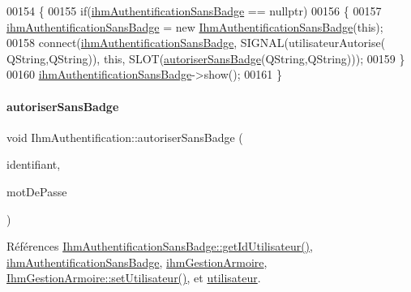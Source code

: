 \begin{DoxyCode}
00154 \{
00155     \textcolor{keywordflow}{if}(\hyperlink{class_ihm_authentification_a9444198403beeaf7386488d56f8ad7f2}{ihmAuthentificationSansBadge} == \textcolor{keyword}{nullptr})
00156     \{
00157         \hyperlink{class_ihm_authentification_a9444198403beeaf7386488d56f8ad7f2}{ihmAuthentificationSansBadge} = \textcolor{keyword}{new} 
      \hyperlink{class_ihm_authentification_sans_badge}{IhmAuthentificationSansBadge}(\textcolor{keyword}{this});
00158         connect(\hyperlink{class_ihm_authentification_a9444198403beeaf7386488d56f8ad7f2}{ihmAuthentificationSansBadge}, SIGNAL(utilisateurAutorise(
      QString,QString)), \textcolor{keyword}{this}, SLOT(\hyperlink{class_ihm_authentification_add8f8e7a0fbf70cef9399ba9f7db7b7e}{autoriserSansBadge}(QString,QString)));
00159     \}    
00160     \hyperlink{class_ihm_authentification_a9444198403beeaf7386488d56f8ad7f2}{ihmAuthentificationSansBadge}->show();
00161 \}
\end{DoxyCode}
\mbox{\label{class_ihm_authentification_add8f8e7a0fbf70cef9399ba9f7db7b7e}} 
\paragraph{\texorpdfstring{autoriser\+Sans\+Badge}{autoriserSansBadge}}
{\footnotesize\ttfamily void Ihm\+Authentification\+::autoriser\+Sans\+Badge (\begin{DoxyParamCaption}\item[{Q\+String}]{identifiant,  }\item[{Q\+String}]{mot\+De\+Passe }\end{DoxyParamCaption})\hspace{0.3cm}{\ttfamily [slot]}}



Références \hyperlink{class_ihm_authentification_sans_badge_acd5fea74d025db830e6e880e55d5c2f0}{Ihm\+Authentification\+Sans\+Badge\+::get\+Id\+Utilisateur()}, \hyperlink{class_ihm_authentification_a9444198403beeaf7386488d56f8ad7f2}{ihm\+Authentification\+Sans\+Badge}, \hyperlink{class_ihm_authentification_a6ce06a3dbea8b929c3ddffdba011c01f}{ihm\+Gestion\+Armoire}, \hyperlink{class_ihm_gestion_armoire_af63a0c4424edd90a3c45506dde527b4e}{Ihm\+Gestion\+Armoire\+::set\+Utilisateur()}, et \hyperlink{class_ihm_authentification_ad08cee96c59182c27198907491f0c963}{utilisateur}.



